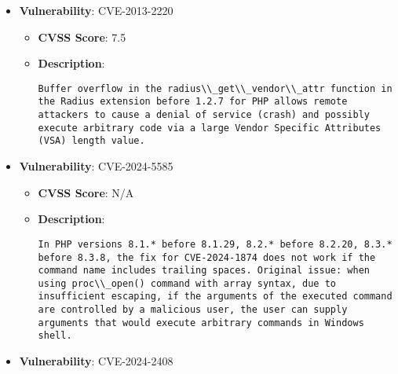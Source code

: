 \documentclass{article}
\begin{document}
\begin{itemize}
\begin{itemize}
{|
            }
        \end{itemize}
    
        \item \textbf{Vulnerability}: CVE-2013-2220
        \begin{itemize}
            \item \textbf{CVSS Score}:  7.5 
            \item \textbf{Description}:
            \parbox[t]{0.9\linewidth}{
                \verb|Buffer overflow in the radius\\_get\\_vendor\\_attr function in the Radius extension before 1.2.7 for PHP allows remote attackers to cause a denial of service (crash) and possibly execute arbitrary code via a large Vendor Specific Attributes (VSA) length value.|
            }
        \end{itemize}
    
        \item \textbf{Vulnerability}: CVE-2024-5585
        \begin{itemize}
            \item \textbf{CVSS Score}:  N/A 
            \item \textbf{Description}:
            \parbox[t]{0.9\linewidth}{
                \verb|In PHP versions 8.1.* before 8.1.29, 8.2.* before 8.2.20, 8.3.* before 8.3.8, the fix for CVE-2024-1874 does not work if the command name includes trailing spaces. Original issue: when using proc\\_open() command with array syntax, due to insufficient escaping, if the arguments of the executed command are controlled by a malicious user, the user can supply arguments that would execute arbitrary commands in Windows shell.|
            }
        \end{itemize}
    
        \item \textbf{Vulnerability}: CVE-2024-2408
\end{itemize}
\end{document}
